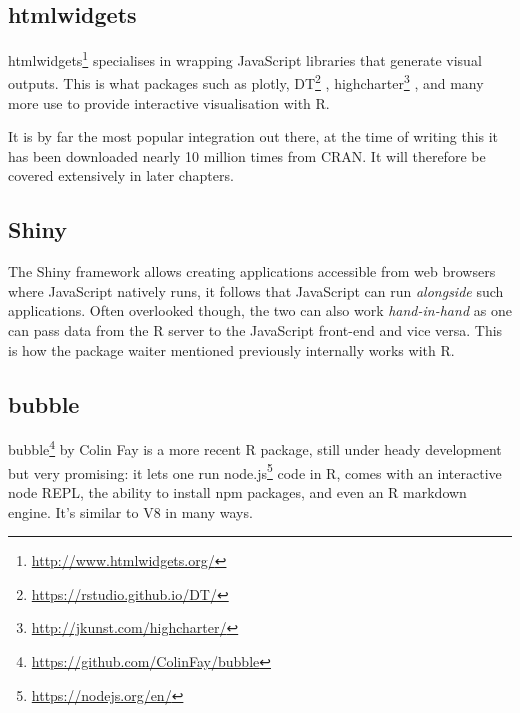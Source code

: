 \documentclass[
]{krantz}
\makeatletter
\newenvironment{Shaded}{\begin{snugshade}}{\end{snugshade}}
\newcommand{\CommentTok}[1]{\textcolor[rgb]{0.37,0.37,0.37}{\textit{#1}}}
\newcommand{\KeywordTok}[1]{\textcolor[rgb]{0.27,0.27,0.27}{\textbf{#1}}}
\newcommand{\NormalTok}[1]{#1}
\newcommand{\OperatorTok}[1]{\textcolor[rgb]{0.43,0.43,0.43}{\textbf{#1}}}
\newcommand{\StringTok}[1]{\textcolor[rgb]{0.5,0.5,0.5}{#1}}
\renewcommand{\href}[2]{#2\footnote{\url{#1}}}
\newenvironment{kframe}{%
\medskip{}
\setlength{\fboxsep}{.8em}
 \def\at@end@of@kframe{}%
 \ifinner\ifhmode%
  \def\at@end@of@kframe{\end{minipage}}%
  \begin{minipage}{\columnwidth}%
 \fi\fi%
 \def\FrameCommand##1{\hskip\@totalleftmargin \hskip-\fboxsep
 \colorbox{shadecolor}{##1}\hskip-\fboxsep
     \hskip-\linewidth \hskip-\@totalleftmargin \hskip\columnwidth}%
 \MakeFramed {\advance\hsize-\width
   \@totalleftmargin\z@ \linewidth\hsize
   \@setminipage}}%
 {\par\unskip\endMakeFramed%
 \at@end@of@kframe}
\renewenvironment{Shaded}{\begin{kframe}}{\end{kframe}}
\makeatother
\begin{document}
\hypertarget{htmlwidgets}{%
\subsection{htmlwidgets}\label{htmlwidgets}}

\href{http://www.htmlwidgets.org/}{htmlwidgets} \citep{R-htmlwidgets} specialises in wrapping JavaScript libraries that generate visual outputs. This is what packages such as plotly, \href{https://rstudio.github.io/DT/}{DT} \citep{R-DT}, \href{http://jkunst.com/highcharter/}{highcharter} \citep{R-highcharter}, and many more use to provide interactive visualisation with R.

It is by far the most popular integration out there, at the time of writing this it has been downloaded nearly 10 million times from CRAN. It will therefore be covered extensively in later chapters.

\hypertarget{shiny}{%
\subsection{Shiny}\label{shiny}}

The Shiny framework allows creating applications accessible from web browsers where JavaScript natively runs, it follows that JavaScript can run \emph{alongside} such applications. Often overlooked though, the two can also work \emph{hand-in-hand} as one can pass data from the R server to the JavaScript front-end and vice versa. This is how the package waiter mentioned previously internally works with R.

\hypertarget{bubble}{%
\subsection{bubble}\label{bubble}}

\href{https://github.com/ColinFay/bubble}{bubble} \citep{R-bubble} by Colin Fay is a more recent R package, still under heady development but very promising: it lets one run \href{https://nodejs.org/en/}{node.js} code in R, comes with an interactive node REPL, the ability to install npm packages, and even an R markdown engine. It's similar to V8 in many ways.

\begin{Shaded}
\end{Shaded}
\end{document}
